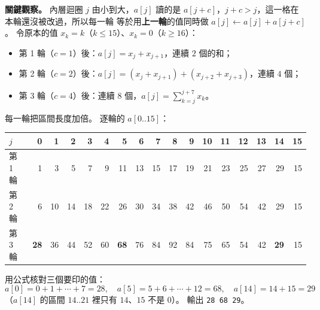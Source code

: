 \begin{pastsoln}
\textbf{關鍵觀察。} 內層迴圈 $j$ 由小到大，$a[j]$ 讀的是 $a[j + c]$，$j + c > j$，這一格在本輪還沒被改過，所以每一輪
等於用\textbf{上一輪}的值同時做 $a[j] \gets a[j] + a[j + c]$。 令原本的值 $x_k = k$（$k \le 15$）、$x_k = 0$（$k \ge 16$）：
\begin{itemize}
\item 第 1 輪（$c = 1$）後：$a[j] = x_j + x_{j+1}$，連續 $2$ 個的和；
\item 第 2 輪（$c = 2$）後：$a[j] = (x_j + x_{j+1}) + (x_{j+2} + x_{j+3})$，連續 $4$ 個；
\item 第 3 輪（$c = 4$）後：連續 $8$ 個，$a[j] = \sum_{k=j}^{j+7} x_k$。
\end{itemize}
每一輪把區間長度加倍。 逐輪的 $a[0..15]$：
\begin{center}
\small
\setlength{\tabcolsep}{3pt}
\begin{tabular}{l*{16}{r}}
\toprule
$j$ & 0 & 1 & 2 & 3 & 4 & 5 & 6 & 7 & 8 & 9 & 10 & 11 & 12 & 13 & 14 & 15 \\
\midrule
第 1 輪 & 1 & 3 & 5 & 7 & 9 & 11 & 13 & 15 & 17 & 19 & 21 & 23 & 25 & 27 & 29 & 15 \\
第 2 輪 & 6 & 10 & 14 & 18 & 22 & 26 & 30 & 34 & 38 & 42 & 46 & 50 & 54 & 42 & 29 & 15 \\
第 3 輪 & \textbf{28} & 36 & 44 & 52 & 60 & \textbf{68} & 76 & 84 & 92 & 84 & 75 & 65 & 54 & 42 & \textbf{29} & 15 \\
\bottomrule
\end{tabular}
\end{center}
用公式核對三個要印的值：
\[
a[0] = 0 + 1 + \cdots + 7 = 28,\quad a[5] = 5 + 6 + \cdots + 12 = 68,\quad a[14] = 14 + 15 = 29
\]
（$a[14]$ 的區間 $14..21$ 裡只有 $14$、$15$ 不是 $0$）。 輸出 \texttt{28 68 29}。
\end{pastsoln}
